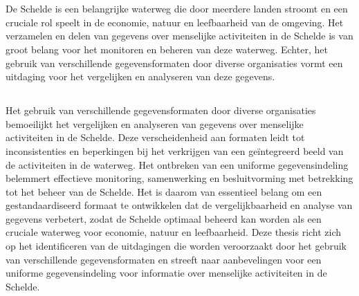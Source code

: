 
\chapter{}%
\label{ch:inleiding}

De Schelde is een belangrijke waterweg die door meerdere landen stroomt en een cruciale rol speelt in de economie, natuur en leefbaarheid van de omgeving. Het verzamelen en delen van gegevens over menselijke activiteiten in de Schelde is van groot belang voor het monitoren en beheren van deze waterweg. Echter, het gebruik van verschillende gegevensformaten door diverse organisaties vormt een uitdaging voor het vergelijken en analyseren van deze gegevens.

\section{}%
\label{sec:probleemstelling}

Het gebruik van verschillende gegevensformaten door diverse organisaties bemoeilijkt het vergelijken en analyseren van gegevens over menselijke activiteiten in de Schelde. Deze verscheidenheid aan formaten leidt tot inconsistenties en beperkingen bij het verkrijgen van een geïntegreerd beeld van de activiteiten in de waterweg. Het ontbreken van een uniforme gegevensindeling belemmert effectieve monitoring, samenwerking en besluitvorming met betrekking tot het beheer van de Schelde. Het is daarom van essentieel belang om een gestandaardiseerd formaat te ontwikkelen dat de vergelijkbaarheid en analyse van gegevens verbetert, zodat de Schelde optimaal beheerd kan worden als een cruciale waterweg voor economie, natuur en leefbaarheid. Deze thesis richt zich op het identificeren van de uitdagingen die worden veroorzaakt door het gebruik van verschillende gegevensformaten en streeft naar aanbevelingen voor een uniforme gegevensindeling voor informatie over menselijke activiteiten in de Schelde.

\section{}%
\label{sec:onderzoeksvraag}

